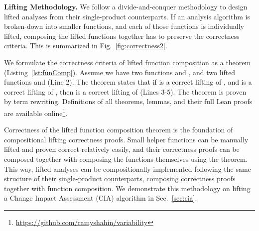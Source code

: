 \vspace{0.1in}
\noindent
{\bf Lifting Methodology.}
We follow a divide-and-conquer methodology to design lifted analyses from their single-product counterparts. If an analysis algorithm is broken-down into smaller functions, and each of those functions is individually lifted, composing the lifted functions together has to preserve the correctness criteria. This is summarized in Fig.~\ref{fig:correctness2}. 

We formulate the correctness criteria of lifted function composition as a theorem (Listing~\ref{lst:funComp}). Assume we have two functions  and , and two lifted functions  and  (Line 2). The theorem states that if  is a correct lifting of , and  is a correct lifting of , then  is a correct lifting of  (Lines 3-5). The theorem is proven by term rewriting. Definitions of all theorems, lemmas, and their full Lean proofs are available online\footnote
{\url{https://github.com/ramyshahin/variability}}.

Correctness of the lifted function composition theorem is the foundation of compositional lifting correctness proofs. Small helper functions can be manually lifted and proven correct relatively easily, and their correctness proofs can be composed together with composing the functions themselves using the theorem. This way, lifted analyses can be compositionally implemented following the same structure of their single-product counterparts, composing correctness proofs together with function composition. We demonstrate this methodology on lifting a Change Impact Assessment (CIA) algorithm in Sec.~\ref{sec:cia}.

 

